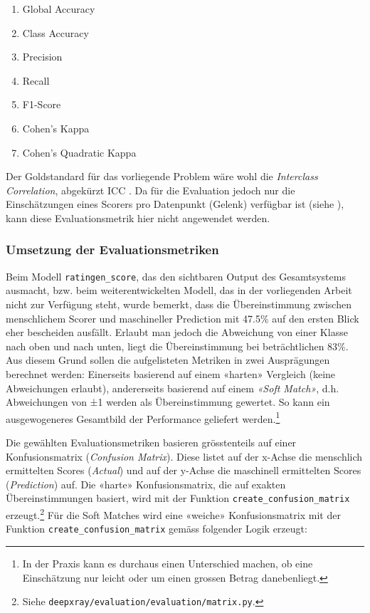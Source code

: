 \begin{multicols}{2}
    \begin{enumerate}
        \item Global Accuracy
        \item Class Accuracy
        \item Precision
        \item Recall
        \item F1-Score
        \item Cohen's Kappa
        \item Cohen's Quadratic Kappa
    \end{enumerate}
\end{multicols}

Der Goldstandard für das vorliegende Problem wäre wohl die \textit{Interclass Correlation}, abgekürzt ICC \cite[Abschnitt 3.3, S. 5-6]{rohrbach2019}. Da für die Evaluation jedoch nur die Einschätzungen eines Scorers pro Datenpunkt (Gelenk) verfügbar ist (siehe ), kann diese Evaluationsmetrik hier nicht angewendet werden.

\subsubsection{Umsetzung der Evaluationsmetriken}

Beim Modell \texttt{ratingen\_score}, das den sichtbaren Output des Gesamtsystems ausmacht, bzw. beim weiterentwickelten Modell, das in der vorliegenden Arbeit nicht zur Verfügung steht, wurde bemerkt, dass die Übereinstimmung zwischen menschlichem Scorer und maschineller Prediction mit 47.5\% auf den ersten Blick eher bescheiden ausfällt. Erlaubt man jedoch die Abweichung von einer Klasse nach oben und nach unten, liegt die Übereinstimmung bei beträchtlichen 83\%. Aus diesem Grund sollen die aufgelisteten Metriken in zwei Ausprägungen berechnet werden: Einerseits basierend auf einem «harten» Vergleich (keine Abweichungen erlaubt), andererseits basierend auf einem \textit{«Soft Match»}, d.h. Abweichungen von ±1 werden als Übereinstimmung gewertet. So kann ein ausgewogeneres Gesamtbild der Performance geliefert werden.\footnote{In der Praxis kann es durchaus einen Unterschied machen, ob eine Einschätzung nur leicht oder um einen grossen Betrag danebenliegt.}

Die gewählten Evaluationsmetriken basieren grösstenteils auf einer Konfusionsmatrix (\textit{Confusion Matrix}). Diese listet auf der x-Achse die menschlich ermittelten Scores (\textit{Actual}) und auf der y-Achse die maschinell ermittelten Scores (\textit{Prediction}) auf. Die «harte» Konfusionsmatrix, die auf exakten Übereinstimmungen basiert, wird mit der Funktion \texttt{create\_confusion\_matrix} erzeugt.\footnote{Siehe \texttt{deepxray/evaluation/evaluation/matrix.py}.} Für die Soft Matches wird eine «weiche» Konfusionsmatrix mit der Funktion \texttt{create\_confusion\_matrix} gemäss folgender Logik erzeugt:

